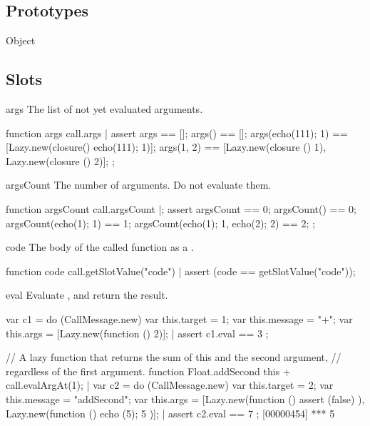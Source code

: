 \subsection{Prototypes}
\begin{refObjects}
\item[Object]
\end{refObjects}

\subsection{Slots}

\begin{urbiscriptapi}
\item[args]%
  The list of not yet evaluated arguments.
\begin{urbiscript}
function args { call.args }|
assert
{
  args == [];
  args() == [];
  args({echo(111); 1}) == [Lazy.new(closure() {echo(111); 1})];
  args(1, 2) == [Lazy.new(closure () {1}),
                 Lazy.new(closure () {2})];
};
\end{urbiscript}


\item[argsCount]
  The number of arguments.  Do not evaluate them.
\begin{urbiscript}
function argsCount { call.argsCount }|;
assert
{
  argsCount == 0;
  argsCount() == 0;
  argsCount({echo(1); 1}) == 1;
  argsCount({echo(1); 1}, {echo(2); 2}) == 2;
};
\end{urbiscript}


\item[code]
  The body of the called function as a .
\begin{urbiscript}
function code { call.getSlotValue("code") }|
assert (code == getSlotValue("code"));
\end{urbiscript}


\item[eval] Evaluate \this, and return the result.
\begin{urbiscript}
var c1 = do (CallMessage.new)
{
  var this.target = 1;
  var this.message = "+";
  var this.args = [Lazy.new(function () {2})];
}|
assert { c1.eval == 3 };

// A lazy function that returns the sum of this and the second argument,
// regardless of the first argument.
function Float.addSecond
{
  this + call.evalArgAt(1);
}|
var c2 = do (CallMessage.new)
{
  var this.target = 2;
  var this.message = "addSecond";
  var this.args = [Lazy.new(function (){ assert (false) }),
                   Lazy.new(function (){ echo (5); 5 })];
}|
assert { c2.eval == 7 };
[00000454] *** 5
\end{urbiscript}



\end{urbiscriptapi}
